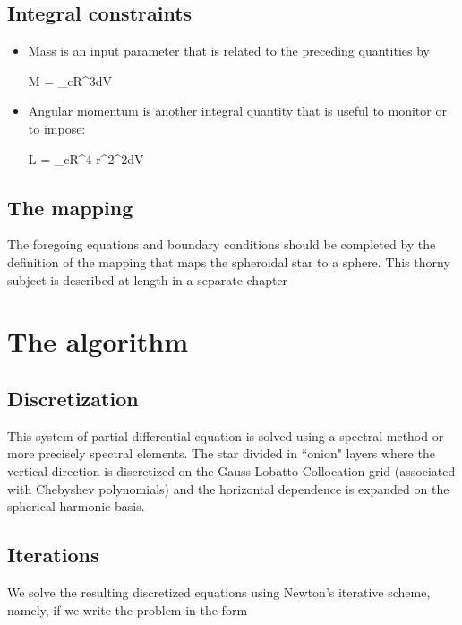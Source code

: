 \subsection{Integral constraints}

\begin{itemize}
\item Mass is an input parameter that is related to the preceding
quantities by

\beq M = \rho_cR^3\intvol \rho dV \eeq

\item Angular momentum is another integral quantity that is useful to
monitor or to impose:

\beq L = \rho_cR^4
\intvol r^2\sin^2\theta\Omega\rho dV \eeq

\end{itemize}

\subsection{The mapping}

The foregoing equations and boundary conditions should be completed by
the definition of the mapping that maps the spheroidal star to a sphere.
This thorny subject is described at length in a separate chapter

\section{The algorithm}

\subsection{Discretization}

This system of partial differential equation is solved using a spectral
method or more precisely spectral elements. The star divided in
``onion" layers where the vertical direction is discretized on the
Gauss-Lobatto Collocation grid (associated with Chebyshev polynomials)
and the horizontal dependence is expanded on the spherical harmonic
basis.

\subsection{Iterations}

We solve the resulting discretized equations using Newton's iterative
scheme, namely, if  we write the problem in the form

